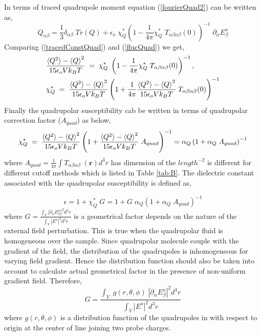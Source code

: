 In terms of traced quadrupole moment equation (\ref{fourierQuad2}) can be written as,
\begin{equation}
{{Q}}_{\alpha\beta} = \frac{1}{3}\delta_{\alpha\beta}\;Tr({Q}) + \epsilon_o\; {\chi}^*_Q\left(1-\frac{1}{4\pi} {\chi}^*_Q\;{T}_{\alpha\beta\alpha\beta}({0})\right)^{-1}\; \partial_\alpha E^o_\beta
\label{tracedConstQuad}
\end{equation}
Comparing (\ref{tracedConstQuad}) and (\ref{flucQuad}) we get,
\begin{equation}
\begin{split}
&\frac{\braket{{Q^2}} - \braket{Q}^2}{15 \epsilon_o Vk_BT}\; =\; {\chi}^*_Q\;\left(1-\frac{1}{4\pi} {\chi}^*_Q\;{T}_{\alpha\beta\alpha\beta}({0})\right)^{-1}, \\ 
&{\chi}^*_Q \;=\; \frac{\braket{{Q^2}} - \braket{Q}^2}{15 \epsilon_o Vk_BT}\left(1 + \frac{1}{4\pi} \frac{\braket{{Q^2}} - \braket{Q}^2}{15 \epsilon_o Vk_BT}\;{T}_{\alpha\beta\alpha\beta}({0})\right)^{-1}
\end{split}
\end{equation}
Finally the quadrupolar susceptibility cab be written in terms of quadrupolar correction factor ($A_{quad}$) as below, 
\begin{equation}
{\chi}^*_Q \;=\; \frac{\braket{{Q^2}} - \braket{Q}^2}{15 \epsilon_o Vk_BT}\left(1 + \frac{\braket{{Q^2}} - \braket{Q}^2}{15 \epsilon_o Vk_BT}\; A_{quad}\right)^{-1} = \alpha_Q\left(1 + \alpha_Q\; A_{quad}\right)^{-1}
\label{eq:quadrupolarSusceptiblity}
\end{equation}
where $A_{quad} = \frac{1}{4\pi}\int {T}_{\alpha\beta\alpha\beta}\;(\textbf{r})d^3r $ has dimension of the $length^{-2}$ is different for different cutoff methods which is listed in Table \ref{tab:B}. The dielectric constant associated with the quadrupolar susceptibility is defined as,\cite{Ernst92}

\begin{equation}
\epsilon = 1 + \chi^*_Q\; G = 1 + G \; \alpha_Q\left(1 + \alpha_Q\;  A_{quad}\right)^{-1}
\label{eq:dielectricFromQuadrupoles}
\end{equation}
where $G = \frac{\displaystyle\int_V |\partial_\alpha E^o_\beta|^2 d^3r}{\displaystyle\int_V{|E^o|}^2 d^3r}$ is a geometrical factor depends on the nature of the external field perturbation. This is true when the quadrupolar fluid is homogeneous over the sample. Since quadrupolar molecule couple with the gradient of the field, the distribution of the quadrupoles is inhomogeneous for varying field gradient. Hence the distribution function should also be taken into account to calculate actual geometrical factor in the presence of non-uniform gradient field. Therefore,
\begin{equation}
G = \frac{\displaystyle\int_V\; g(r, \theta, \phi)\; |\partial_\alpha E^o_\beta|^2 d^3r}{\displaystyle\int_V{|E^o|}^2 d^3r}
\label{eq:geometricalFactor}
\end{equation}
where $g(r,\theta, \phi)$ is a distribution function of the quadrupoles in with respect to origin at the center of line joining two probe charges.  

